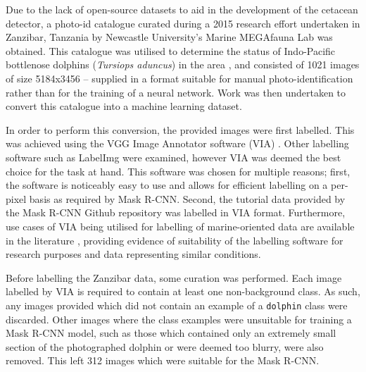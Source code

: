 Due to the lack of open-source datasets to aid in the development of the cetacean detector, a photo-id catalogue curated during a 2015 research effort undertaken in Zanzibar, Tanzania by Newcastle University's Marine MEGAfauna Lab was obtained. This catalogue was utilised to determine the status of Indo-Pacific bottlenose dolphins (\textit{Tursiops aduncus}) in the area \cite{sharpe_indian_2019}, and consisted of 1021 images of size 5184x3456 -- supplied in a format suitable for manual photo-identification rather than for the training of a neural network. Work was then undertaken to convert this catalogue into a machine learning dataset. 

In order to perform this conversion, the provided images were first labelled. This was achieved using the VGG Image Annotator software (VIA) \cite{dutta_via_2019}. Other labelling software such as LabelImg \cite{tzutalin_labelimg_2021} were examined, however VIA was deemed the best choice for the task at hand. This software was chosen for multiple reasons; first, the software is noticeably easy to use and allows for efficient labelling on a per-pixel basis as required by Mask R-CNN. Second, the tutorial data provided by the Mask R-CNN Github repository was labelled in VIA format. Furthermore, use cases of VIA being utilised for labelling of marine-oriented data are available in the literature \cite{nita_cnn-based_2020}, providing evidence of suitability of the labelling software for research purposes and data representing similar conditions.

Before labelling the Zanzibar data, some curation was performed. Each image labelled by VIA is required to contain at least one non-background class. As such, any images provided which did not contain an example of a \texttt{dolphin} class were discarded. Other images where the class examples were unsuitable for training a Mask R-CNN model, such as those which contained only an extremely small section of the photographed dolphin or were deemed too blurry, were also removed. This left 312 images which were suitable for the Mask R-CNN.

